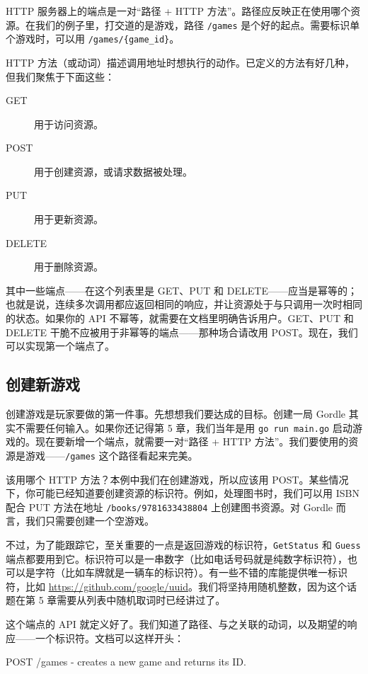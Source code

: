 HTTP 服务器上的端点是一对``路径 + HTTP 方法''。路径应反映正在使用哪个资源。在我们的例子里，打交道的是游戏，路径 \texttt{/games} 是个好的起点。需要标识单个游戏时，可以用 \texttt{/games/\{game\_id\}}。

HTTP 方法（或动词）描述调用地址时想执行的动作。已定义的方法有好几种，但我们聚焦于下面这些：

\begin{description}
  \item[GET] 用于访问资源。
  \item[POST] 用于创建资源，或请求数据被处理。
  \item[PUT] 用于更新资源。
  \item[DELETE] 用于删除资源。
\end{description}

其中一些端点——在这个列表里是 GET、PUT 和 DELETE——应当是幂等的；也就是说，连续多次调用都应返回相同的响应，并让资源处于与只调用一次时相同的状态。如果你的 API 不幂等，就需要在文档里明确告诉用户。GET、PUT 和 DELETE 干脆不应被用于非幂等的端点——那种场合请改用 POST。现在，我们可以实现第一个端点了。

\subsection{创建新游戏}

创建游戏是玩家要做的第一件事。先想想我们要达成的目标。创建一局 Gordle 其实不需要任何输入。如果你还记得第 5 章，我们当年是用 \texttt{go run main.go} 启动游戏的。现在要新增一个端点，就需要一对``路径 + HTTP 方法''。我们要使用的资源是游戏——\texttt{/games} 这个路径看起来完美。

该用哪个 HTTP 方法？本例中我们在创建游戏，所以应该用 POST。某些情况下，你可能已经知道要创建资源的标识符。例如，处理图书时，我们可以用 ISBN 配合 PUT 方法在地址 \texttt{/books/9781633438804} 上创建图书资源。对 Gordle 而言，我们只需要创建一个空游戏。

不过，为了能跟踪它，至关重要的一点是返回游戏的标识符，\texttt{GetStatus} 和
\texttt{Guess} 端点都要用到它。标识符可以是一串数字（比如电话号码就是纯数字标识符），也可以是字符（比如车牌就是一辆车的标识符）。有一些不错的库能提供唯一标识符，比如 \url{https://github.com/google/uuid}。我们将坚持用随机整数，因为这个话题在第 5 章需要从列表中随机取词时已经讲过了。

这个端点的 API 就定义好了。我们知道了路径、与之关联的动词，以及期望的响应——一个标识符。文档可以这样开头：

\begin{gocode}[]
POST /games - creates a new game and returns its ID.
\end{gocode}


